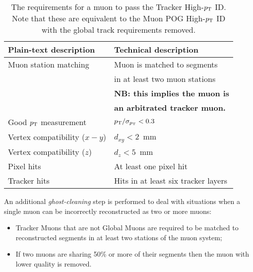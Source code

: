 \begin{table}
    \begin{small}
    \begin{center}
    \caption{
      The requirements for a muon to pass the Tracker High-$p_{\mathrm{T}}$ ID. Note that
      these are equivalent to the Muon POG High-$p_{\mathrm{T}}$ ID with the global track 
      requirements removed.
      }
    \begin{tabular}{|l|l|}
      \hline
      Plain-text description         & Technical description                 \\
      \hline
      Muon station matching          & Muon is matched to segments           \\
                                     & in at least two muon stations         \\
                                     & \textbf{NB: this implies the muon is} \\
                                     & \textbf{an arbitrated tracker muon.}  \\
      \hline                                                          
      Good $p_{\mathrm{T}}$ measurement         & $p_{\mathrm{T}} / \sigma_{p_{\mathrm{T}}} < 0.3$            \\
      \hline
      Vertex compatibility ($x-y$)   & $d_{xy} < 2$~mm                       \\
      \hline
      Vertex compatibility ($z$)     & $d_{z} < 5$~mm                        \\
      \hline
      Pixel hits                     & At least one pixel hit                \\
      \hline
      Tracker hits                   & Hits in at least six tracker layers   \\
      \hline
    \end{tabular}
    \label{tab:highPtID}
    \end{center}
    \end{small}
\end{table}

An additional \textit{ghost-cleaning} step is performed to deal with situations when a single muon
can be incorrectly reconstructed as two or more muons:

\begin{itemize}

\item Tracker Muons that are not Global Muons are required to be matched to reconstructed segments in at least two stations of the muon system;
\item If two muons are sharing 50\% or more of their segments then the muon with lower quality is removed.

\end{itemize}
